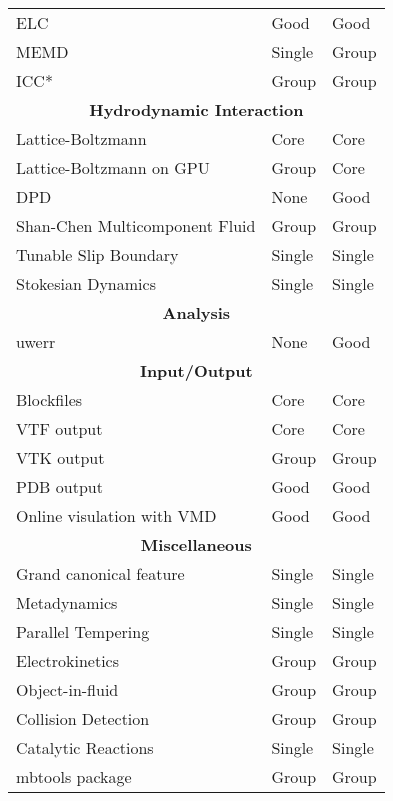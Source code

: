 \begin{longtable}{|l|l|l|}
  ELC                                 & Good   & Good   \\
  MEMD                                & Single & Group  \\
  ICC*                                & Group  & Group  \\
  \multicolumn{3}{|c|}{\textbf{Hydrodynamic Interaction}} \\
  Lattice-Boltzmann                   & Core   & Core   \\
  Lattice-Boltzmann on GPU            & Group  & Core   \\
  DPD                                 & None   & Good   \\
  Shan-Chen Multicomponent Fluid      & Group  & Group  \\
  Tunable Slip Boundary               & Single & Single \\
  Stokesian Dynamics                  & Single & Single \\
  \multicolumn{3}{|c|}{\textbf{Analysis}} \\
  uwerr                               & None   & Good   \\
  \multicolumn{3}{|c|}{\textbf{Input/Output}} \\
  Blockfiles                          & Core   & Core   \\
  VTF output                          & Core   & Core   \\
  VTK output                          & Group  & Group  \\
  PDB output                          & Good   & Good   \\
  Online visulation with VMD          & Good   & Good   \\
  \multicolumn{3}{|c|}{\textbf{Miscellaneous}} \\
  Grand canonical feature             & Single & Single \\
  Metadynamics                        & Single & Single \\
  Parallel Tempering                  & Single & Single \\
  Electrokinetics                     & Group  & Group  \\
  Object-in-fluid                     & Group  & Group  \\
  Collision Detection                 & Group  & Group  \\
  Catalytic Reactions                 & Single & Single \\
  mbtools package                     & Group  & Group  \\
  \hline
\end{longtable}


